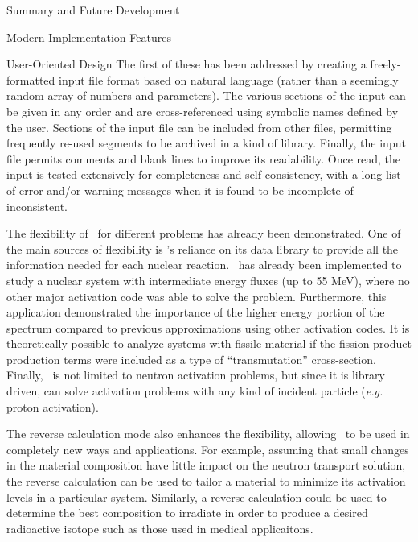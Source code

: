 \begin{chapter}{Summary and Future Development}
\begin{section}{Modern Implementation Features\label{sec:summary.modern}}
\begin{subsection}{User-Oriented Design}
      The first of these has been addressed by creating a
      freely-formatted input file format based on natural language
      (rather than a seemingly random array of numbers and
      parameters).  The various sections of the input can be given in
      any order and are cross-referenced using symbolic names defined
      by the user.  Sections of the input file can be included from
      other files, permitting frequently re-used segments to be
      archived in a kind of library.  Finally, the input file permits
      comments and blank lines to improve its readability.  Once read,
      the input is tested extensively for completeness and
      self-consistency, with a long list of error and/or warning
      messages when it is found to be incomplete of inconsistent.
      
      The flexibility of \ALARA\ for different problems has already
      been demonstrated.  One of the main sources of flexibility is
      \ALARA's reliance on its data library to provide all the
      information needed for each nuclear reaction.  \ALARA\ has
      already been implemented to study a nuclear system with
      intermediate energy fluxes (up to 55 MeV), where no other major
      activation code was able to solve the problem.  Furthermore,
      this application demonstrated the importance of the higher
      energy portion of the spectrum compared to previous
      approximations using other activation codes.  It is
      theoretically possible to analyze systems with fissile material
      if the fission product production terms were included as a type
      of ``transmutation'' cross-section.  Finally, \ALARA\ is not
      limited to neutron activation problems, but since it is library
      driven, can solve activation problems with any kind of incident
      particle (\textsl{e.g.} proton activation).
      
      The reverse calculation mode also enhances the flexibility,
      allowing \ALARA\ to be used in completely new ways and
      applications.  For example, assuming that small changes in the
      material composition have little impact on the neutron transport
      solution, the reverse calculation can be used to tailor a
      material to minimize its activation levels in a particular
      system.  Similarly, a reverse calculation could be used to
      determine the best composition to irradiate in order to produce
      a desired radioactive isotope such as those used in medical
      applicaitons.
    \end{subsection}


\end{section}
\end{chapter}
